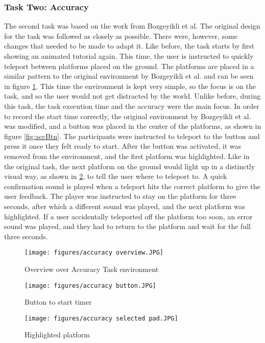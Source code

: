 \subsubsection{Task Two: Accuracy}
The second task was based on the work from Bozgeyikli et al. %
The original design for the task was followed as closely as possible. There were, however, some changes that needed to be made to adapt it. Like before, the task starts by first showing an animated tutorial again. This time, the user is instructed to quickly teleport between platforms placed on the ground. The platforms are placed in a similar pattern to the original environment by Bozgeyikli et al. and can be seen in figure \ref{fig:accOver}. This time the environment is kept very simple, so the focus is on the task, and so the user would not get distracted by the world. Unlike before, during this task, the task execution time and the accuracy were the main focus. In order to record the start time correctly, the original environment by Bozgeyikli et al. was modified, and a button was placed in the center of the platforms, as shown in figure \ref{fig:accBtn}. The participants were instructed to teleport to the button and press it once they felt ready to start. After the button was activated, it was removed from the environment, and the first platform was highlighted. Like in the original task, the next platform on the ground would light up in a distinctly visual way, as shown in \ref{fig:accPad}, to tell the user where to teleport to. A quick confirmation sound is played when a teleport hits the correct platform to give the user feedback. The player was instructed to stay on the platform for three seconds, after which a different sound was played, and the next platform was highlighted. If a user accidentally teleported off the platform too soon, an error sound was played, and they had to return to the platform and wait for the full three seconds. 

\begin{figure}[!ht]
    \centering
    \texttt{[image: figures/accuracy overview.JPG]}
    \caption{Overview over Accuracy Task environment}
    \label{fig:accOver}
\end{figure}

\begin{figure}[!htb]
        \texttt{[image: figures/accuracy button.JPG]}
        \caption{Button to start timer}
        \label{fig:accBtn}
    \endminipage\hfill
        \texttt{[image: figures/accuracy selected pad.JPG]}
        \caption{Highlighted platform}
        \label{fig:accPad}
    \endminipage\hfill
\end{figure}

